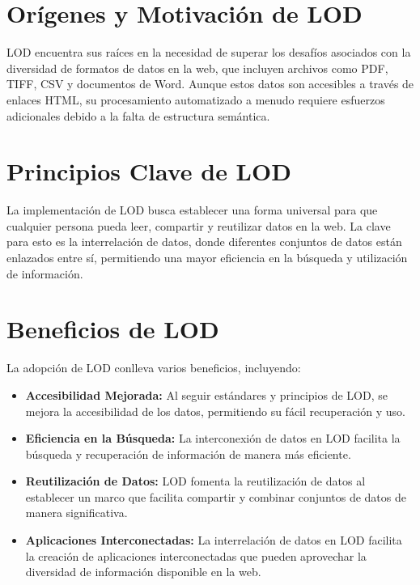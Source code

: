 \documentclass[11pt]{report}
\begin{document}
		\section{Orígenes y Motivación de LOD}

		LOD encuentra sus raíces en la necesidad de superar los desafíos asociados con la diversidad de formatos de datos en la web, que incluyen archivos como PDF, TIFF, CSV y documentos de Word. Aunque estos datos son accesibles a través de enlaces HTML, su procesamiento automatizado a menudo requiere esfuerzos adicionales debido a la falta de estructura semántica.

		\section{Principios Clave de LOD}

		La implementación de LOD busca establecer una forma universal para que cualquier persona pueda leer, compartir y reutilizar datos en la web. La clave para esto es la interrelación de datos, donde diferentes conjuntos de datos están enlazados entre sí, permitiendo una mayor eficiencia en la búsqueda y utilización de información.

		\section{Beneficios de LOD}

		La adopción de LOD conlleva varios beneficios, incluyendo:

		\begin{itemize}
		\item \textbf{Accesibilidad Mejorada:} Al seguir estándares y principios de LOD, se mejora la accesibilidad de los datos, permitiendo su fácil recuperación y uso.
		
		\item \textbf{Eficiencia en la Búsqueda:} La interconexión de datos en LOD facilita la búsqueda y recuperación de información de manera más eficiente.
		
		\item \textbf{Reutilización de Datos:} LOD fomenta la reutilización de datos al establecer un marco que facilita compartir y combinar conjuntos de datos de manera significativa.
		
		\item \textbf{Aplicaciones Interconectadas:} La interrelación de datos en LOD facilita la creación de aplicaciones interconectadas que pueden aprovechar la diversidad de información disponible en la web.
		\end{itemize}
\end{document}
